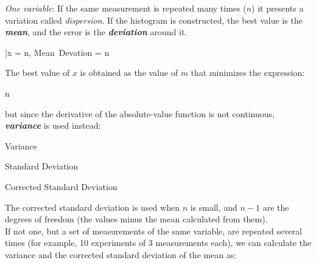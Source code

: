 	\bi
		\item \textit{One variable}:
If the same measurement is repeated many times ($n$) it presents a variation called \textit{dispersion}. If the histogram is constructed, the best value is the \textbf{\textit{mean}}, and the error is the \textbf{\textit{deviation}} around it.

		\be \bar{x} = n, \qquad Mean\ Devation = n\ee

The best value of $x$ is obtained as the value of $m$ that minimizes the expression:

		\be {}n\ee

but since the derivative of the absolute-value function is not continuous, \textbf{\textit{variance}} is used instead:


		\bc\begin{minipage}{.3\textwidth}
			\bc\AlegreyaSansSC\color{gray} Variance\ec
		\end{minipage}%
		\begin{minipage}{.5\textwidth}
		\end{minipage}\ec

		\bc\begin{minipage}{.3\textwidth}
			\bc\AlegreyaSansSC\color{gray} Standard Deviation\ec
		\end{minipage}%
		\begin{minipage}{.5\textwidth}
		\end{minipage}\ec

		\bc\begin{minipage}{.3\textwidth}
			\bc\AlegreyaSansSC\color{gray} Corrected Standard Deviation\ec
		\end{minipage}%
		\begin{minipage}{.5\textwidth}
		\end{minipage}\ec

The corrected standard deviation is used when $n$ is small, and $n-1$ are the degrees of freedom (the values minus the mean calculated from them).\\

If not one, but a set of measurements of the same variable, are repeated several times (for example, 10 experiments of 3 measurements each), we can calculate the variance and the corrected standard deviation of the mean as:

